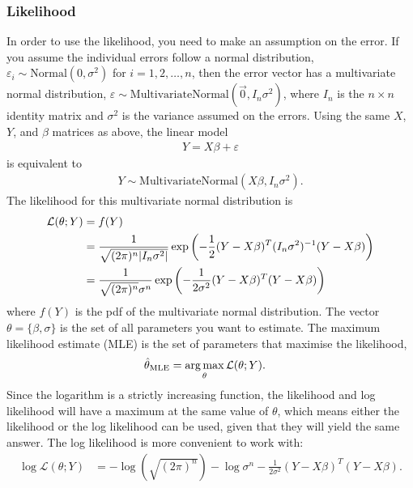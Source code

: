 \documentclass[a4paper]{article}
\begin{document}
\subsubsection{Likelihood}
In order to use the likelihood, you need to make an assumption on the error.
If you assume the individual errors follow a normal distribution,
$\varepsilon_i \sim \text{Normal}(0, \sigma^2)$ for $ i = 1 ,2 , \ldots , n $,
then the error vector has a multivariate normal distribution, $\varepsilon \sim \text{MultivariateNormal}(\vec{0}, I_n \sigma^2)$,
where $I_n$ is the $n \times n$ identity matrix and $\sigma^2$ is the variance assumed on the errors. Using the same $X$, $Y$, and $\beta$ matrices as above, the linear model
\begin{align*}
  Y = X \beta + \varepsilon
\end{align*}
is equivalent to
\begin{align*}
  Y \sim \text{MultivariateNormal}(X \beta, I_n \sigma^2 )
  \text{.}
\end{align*}
The likelihood for this multivariate normal distribution is
\begin{align*}
\mathcal{L}(\theta;Y) &= f(Y) \\
&=
\frac{1}{\sqrt{(2\pi)^n \lvert I_n \sigma^2\rvert }}
\exp{
  \left(
  -\frac{1}{2}
   (Y-X\beta)^T  (I_n \sigma^2)^{-1} (Y - X \beta)
  \right)
} \\
&=
\frac{1}{\sqrt{(2\pi)^n  } \sigma^{n}}
\exp{
  \left(
  -\frac{1}{2 \sigma^2}
   (Y-X\beta)^T (Y-X\beta)
  \right)
}
\end{align*}
where $f(Y)$ is the pdf of the multivariate normal distribution.
The vector $\theta = \{ \beta, \sigma \}$ is the set of all parameters you want to estimate.
The maximum likelihood estimate (MLE) is the set of parameters that maximise the likelihood,
\begin{align}
\label{eq:regressiontheory:argmax}
\hat{\theta}_{\text{MLE}}
&=
\operatorname*{arg\,max}_{\theta}
\mathcal{L}(\theta;Y)
\text{.}
\end{align}
Since the logarithm is a strictly increasing function, the likelihood and log likelihood will have a maximum at the same value of $\theta$,
which means either the likelihood or the log likelihood can be used, given that they will yield the same answer.
The log likelihood is more convenient to work with:
\begin{align*}
\log\mathcal{L}(\theta;Y)
&=
-\log\left(\sqrt{(2\pi)^n} \right)
-\log\sigma^{n}
  -\frac{1}{2 \sigma^2}
   (Y-X\beta)^T (Y-X\beta)
   \text{.}
\end{align*}
\end{document}
